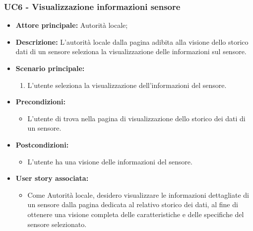 \subsubsection{UC6 - Visualizzazione informazioni sensore}
\begin{itemize}
    \item \textbf{Attore principale:} Autorità locale;
    \item \textbf{Descrizione:} L’autorità locale dalla pagina adibita alla visione dello storico dati di un sensore seleziona la visualizzazione delle informazioni sul sensore.
    \item \textbf{Scenario principale:}
          \begin{enumerate}
              \item L'utente seleziona la visualizzazione dell'informazioni del sensore.
          \end{enumerate}
    \item \textbf{Precondizioni:}
          \begin{itemize}
              \item  L'utente di trova nella pagina di visualizzazione dello storico dei dati di un sensore.
          \end{itemize}
    \item \textbf{Postcondizioni:}
          \begin{itemize}
              \item  L'utente ha una visione delle informazioni del sensore.
          \end{itemize}
    \item \textbf{User story associata:}
          \begin{itemize}
              \item Come Autorità locale, desidero visualizzare le informazioni dettagliate di un sensore dalla pagina dedicata al relativo storico dei dati, al fine di ottenere una visione completa delle caratteristiche e delle specifiche del sensore selezionato.
          \end{itemize}
\end{itemize}